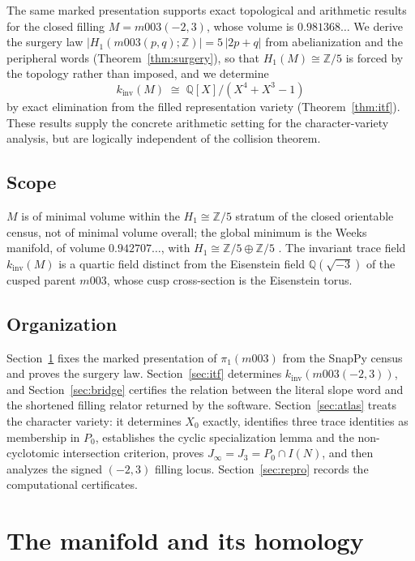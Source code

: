 \documentclass[11pt,a4paper]{article}
\theoremstyle{definition}
\theoremstyle{remark}
\newcommand{\kinv}{k_{\mathrm{inv}}}
\newcommand{\Zfive}{\mathbb{Z}/5}
\newcommand{\Q}{\mathbb{Q}}
\newcommand{\Z}{\mathbb{Z}}
\begin{document}
The same marked presentation supports exact topological and arithmetic
results for the closed filling $M = m003(-2,3)$, whose volume is
$0.981368\ldots$ We derive the surgery law
$|H_1(m003(p,q);\Z)| = 5\,|2p+q|$ from abelianization and the peripheral
words (Theorem~\ref{thm:surgery}), so that $H_1(M) \cong \Zfive$ is forced
by the topology rather than imposed, and we determine
\begin{equation}
\kinv(M) \;\cong\; \Q[X]/(X^4+X^3-1)
\end{equation}
by exact elimination from the filled representation variety
(Theorem~\ref{thm:itf}). These results supply the concrete arithmetic
setting for the character-variety analysis, but are logically independent
of the collision theorem.

\subsection{Scope}

$M$ is of minimal volume within the $H_1 \cong \Zfive$ stratum of the
closed orientable census, not of minimal volume overall; the global
minimum is the Weeks manifold, of volume $0.942707\ldots$, with
$H_1 \cong \Zfive \oplus \Zfive$ \cite{GMM2009}. The invariant trace
field $\kinv(M)$ is a quartic field distinct from the Eisenstein field
$\Q(\sqrt{-3})$ of the cusped parent $m003$, whose cusp cross-section is
the Eisenstein torus.

\subsection{Organization}

Section~\ref{sec:homology} fixes the marked presentation of
$\pi_1(m003)$ from the SnapPy census \cite{SnapPy} and proves the surgery
law. Section~\ref{sec:itf} determines $\kinv(m003(-2,3))$, and
Section~\ref{sec:bridge} certifies the relation between the literal slope
word and the shortened filling relator returned by the software.
Section~\ref{sec:atlas} treats the character variety: it determines $X_0$
exactly, identifies three trace identities as membership in $P_0$,
establishes the cyclic specialization lemma and the non-cyclotomic
intersection criterion, proves
$J_\infty = J_3 = P_0 \cap I(N)$, and then analyzes the signed $(-2,3)$
filling locus. Section~\ref{sec:repro} records the computational
certificates.

\section{The manifold and its homology}
\label{sec:homology}
\end{document}

